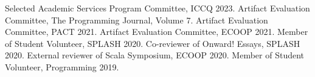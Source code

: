 \begin{rubric}{Selected Academic Services}
  \entry*[2023] Program Committee, ICCQ 2023.
  \entry*[2022] Artifact Evaluation Committee, The Programming Journal, Volume 7.
  \entry*[2021] Artifact Evaluation Committee, PACT 2021.
  \entry*[2021] Artifact Evaluation Committee, ECOOP 2021.
  \entry*[2020] Member of Student Volunteer, SPLASH 2020.
  \entry*[2020] Co-reviewer of Onward! Essays, SPLASH 2020.
  \entry*[2020] External reviewer of Scala Symposium, ECOOP 2020.
  \entry*[2019] Member of Student Volunteer, Programming 2019.
\end{rubric}
